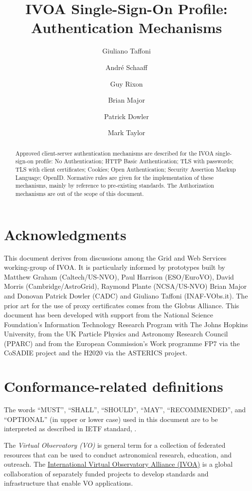 \documentclass[11pt,a4paper]{ivoa}
\title{IVOA Single-Sign-On Profile: Authentication Mechanisms}
\author{Giuliano Taffoni}
\author{Andr\'e Schaaff}
\author{Guy Rixon}
\author{Brian Major}
\author{Patrick Dowler}
\author{Mark Taylor}
\begin{document}
\begin{abstract}
Approved client-server authentication mechanisms are described for the IVOA single-sign-on profile: No Authentication; HTTP Basic Authentication; TLS with passwords; TLS with client certificates; Cookies; Open Authentication; Security Assertion Markup Language; OpenID. Normative rules are given for the implementation of these mechanisms, mainly by reference to pre-existing standards. The Authorization mechanisms are out of the scope of this document.
\end{abstract}


\section*{Acknowledgments}

This document derives from discussions among the Grid and Web Services working-group of IVOA. It is particularly informed by prototypes built by Matthew Graham (Caltech/US-NVO), Paul Harrison (ESO/EuroVO), David Morris (Cambridge/AstroGrid), Raymond Plante (NCSA/US-NVO) Brian Major and  Donovan Patrick Dowler (CADC) and Giuliano Taffoni (INAF-VObs.it).
The prior art for the use of proxy certificates comes from the Globus Alliance.
This document has been developed with support from the National Science Foundation's Information Technology Research Program  with The Johns Hopkins University, from the UK Particle Physics and Astronomy Research Council (PPARC) and from the European Commission's Work programme FP7 via the  CoSADIE project and the H2020 via the ASTERICS project.


\section*{Conformance-related definitions}
The words ``MUST'', ``SHALL'', ``SHOULD'', ``MAY'', ``RECOMMENDED'', and
``OPTIONAL'' (in upper or lower case) used in this document are to be
interpreted as described in IETF standard, \citet{std:RFC2119}.

The \emph{Virtual Observatory (VO)} is
general term for a collection of federated resources that can be used
to conduct astronomical research, education, and outreach.
The \href{http://www.ivoa.net}{International
Virtual Observatory Alliance (IVOA)} is a global
collaboration of separately funded projects to develop standards and
infrastructure that enable VO applications.
\end{document}
